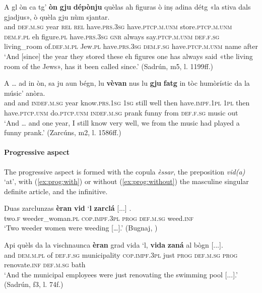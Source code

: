 \ea
\label{ex:dcomp:2}
\gll A gl òn ca tg’ \textbf{òn} \textbf{gju} \textbf{dépònju} quèlas ah figuras ò inṣ adina détg «la stiva dals gjadjus», ò quèla gju nùm sjantar.\\
and \textsc{def.m.sg} year \textsc{rel} \textsc{rel} have.\textsc{prs.3sg} have.\textsc{ptcp.m.unm} store.\textsc{ptcp.m.unm} \textsc{dem.f.pl} eh figure.\textsc{pl} have.\textsc{prs.3sg} \textsc{gnr} always say.\textsc{ptcp.m.unm} \textsc{def.f.sg} living\_room of.\textsc{def.m.pl} Jew.\textsc{pl} have.\textsc{prs.3sg} \textsc{dem.f.sg} have.\textsc{ptcp.m.unm} name after\\
\glt `And [since] the year they stored these eh figures one has always said «the living room of the Jews», has it been called since.' (Sadrún, m5, l. 1199ff.)
\z

\ea
\label{ex:dcomp:4}
\gll    A … ad in òn, sa ju aun bégn, lu \textbf{vèvan} nus lu \textbf{gju} \textbf{fatg} in tòc humòrístic  da la músic’ anòra.\\
and {} and  \textsc{indef.m.sg} year know.\textsc{prs.1sg} \textsc{1sg} still well then have.\textsc{impf.1pl} \textsc{1pl} then have.\textsc{ptcp.unm} do.\textsc{ptcp.unm} \textsc{indef.m.sg} prank funny from \textsc{def.f.sg} music out\\
\glt `And … and one year, I still know very well, we from the music had played a funny prank.' (Zarcúns, m2, l. 1586ff.)
\z

\paragraph{Progressive aspect}
The progressive aspect is formed with the copula \textit{èssar}, the preposition \textit{vid(a)} ‘at’, with (\ref{ex:prog:with}) or without (\ref{ex:prog:without}) the masculine singular definite article, and the infinitive.

\ea\label{ex:prog:with}
\gll    Duas zarclunzas \textbf{èran} \textbf{vid} `\textbf{l} \textbf{zarclá} [...] .\\
     two.\textsc{f} weeder\_woman.\textsc{pl} \textsc{cop.impf.3pl} \textsc{prog} \textsc{def.m.sg} weed.\textsc{inf}\\
\glt `Two weeder women were weeding […].' (Bugnaj, \citealt[132]{Büchli1966})
\z

\ea\label{ex:prog:without}
\gll  Api quèls da la vischnaunca \textbf{èran} grad vida `l, \textbf{vida} \textbf{zaná} al bògn [...].  \\
and \textsc{dem.m.pl} of \textsc{def.f.sg} municipality \textsc{cop.impf.3pl} just \textsc{prog} \textsc{def.m.sg} \textsc{prog} renovate.\textsc{inf} \textsc{def.m.sg} bath\\
\glt `And the municipal employees were just renovating the swimming pool [...].' (Sadrún, f3, l. 74f.)
\z

